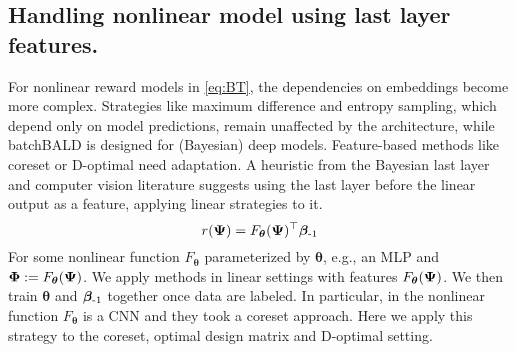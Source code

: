 \subsection{Handling nonlinear model using last layer features.}
For nonlinear reward models in \cref{eq:BT}, the dependencies on embeddings become more complex. Strategies like maximum difference and entropy sampling, which depend only on model predictions, remain unaffected by the architecture, while batchBALD is designed for (Bayesian) deep models. Feature-based methods like coreset or D-optimal need adaptation. A heuristic from the Bayesian last layer \citep{tran2019bayesian} and computer vision literature \citet{sener2017active} suggests using the last layer before the linear output as a feature, applying linear strategies to it.
\begin{equation}
    r(\bm{\Psi}) = F_{\bm \theta}(\bm{\Psi})^\top \bm{\beta}_{\text{-1}}
\end{equation}
For some nonlinear function $F_{\bm \theta}$ parameterized by $\bm\theta$, e.g., an MLP and $\bm{\Phi} := F_{\bm \theta}(\bm{\Psi})$. We apply methods in linear settings with features $F_{\bm \theta}(\bm{\Psi})$. We then train $\bm\theta$ and $\bm{\beta}_{\text{-1}}$ together once data are labeled. In particular, in \citet{sener2017active} the nonlinear function $F_{\bm \theta}$ is a CNN and they took a coreset approach. Here we apply this strategy to the coreset, optimal design matrix and D-optimal setting.  



